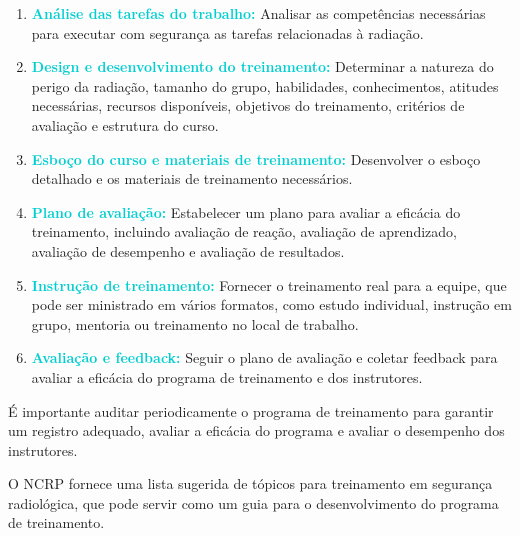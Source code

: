 \documentclass[11pt,a4paper]{article}
\begin{document}
	\begin{enumerate}
		\item \textcolor{DarkTurquoise}{\textbf{Análise das tarefas do trabalho:}} Analisar as competências necessárias para executar com segurança as tarefas relacionadas à radiação.
		
		\item \textcolor{DarkTurquoise}{\textbf{Design e desenvolvimento do treinamento:}} Determinar a natureza do perigo da radiação, tamanho do grupo, habilidades, conhecimentos, atitudes necessárias, recursos disponíveis, objetivos do treinamento, critérios de avaliação e estrutura do curso.
		
		\item \textcolor{DarkTurquoise}{\textbf{Esboço do curso e materiais de treinamento:}} Desenvolver o esboço detalhado e os materiais de treinamento necessários.
		
		\item \textcolor{DarkTurquoise}{\textbf{Plano de avaliação:}} Estabelecer um plano para avaliar a eficácia do treinamento, incluindo avaliação de reação, avaliação de aprendizado, avaliação de desempenho e avaliação de resultados.
		
		\item \textcolor{DarkTurquoise}{\textbf{Instrução de treinamento:}} Fornecer o treinamento real para a equipe, que pode ser ministrado em vários formatos, como estudo individual, instrução em grupo, mentoria ou treinamento no local de trabalho.
		
		\item \textcolor{DarkTurquoise}{\textbf{Avaliação e feedback:}} Seguir o plano de avaliação e coletar feedback para avaliar a eficácia do programa de treinamento e dos instrutores.
	\end{enumerate}

É importante auditar periodicamente o programa de treinamento para garantir um registro adequado, avaliar a eficácia do programa e avaliar o desempenho dos instrutores.

O NCRP fornece uma lista sugerida de tópicos para treinamento em segurança radiológica, que pode servir como um guia para o desenvolvimento do programa de treinamento.
\end{document}
